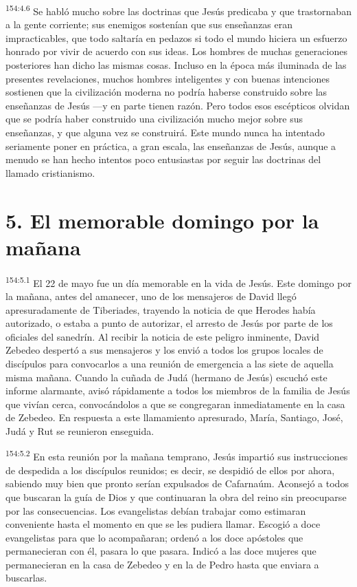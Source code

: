 \par
\textsuperscript{154:4.6} Se habló mucho sobre las doctrinas que Jesús predicaba y que trastornaban a la gente corriente; sus enemigos sostenían que sus enseñanzas eran impracticables, que todo saltaría en pedazos si todo el mundo hiciera un esfuerzo honrado por vivir de acuerdo con sus ideas. Los hombres de muchas generaciones posteriores han dicho las mismas cosas. Incluso en la época más iluminada de las presentes revelaciones, muchos hombres inteligentes y con buenas intenciones sostienen que la civilización moderna no podría haberse construido sobre las enseñanzas de Jesús ---y en parte tienen razón. Pero todos esos escépticos olvidan que se podría haber construido una civilización mucho mejor sobre sus enseñanzas, y que alguna vez se construirá. Este mundo nunca ha intentado seriamente poner en práctica, a gran escala, las enseñanzas de Jesús, aunque a menudo se han hecho intentos poco entusiastas por seguir las doctrinas del llamado cristianismo.

\section*{5. El memorable domingo por la mañana}
\par
\textsuperscript{154:5.1} El 22 de mayo fue un día memorable en la vida de Jesús. Este domingo por la mañana, antes del amanecer, uno de los mensajeros de David llegó apresuradamente de Tiberiades, trayendo la noticia de que Herodes había autorizado, o estaba a punto de autorizar, el arresto de Jesús por parte de los oficiales del sanedrín. Al recibir la noticia de este peligro inminente, David Zebedeo despertó a sus mensajeros y los envió a todos los grupos locales de discípulos para convocarlos a una reunión de emergencia a las siete de aquella misma mañana. Cuando la cuñada de Judá (hermano de Jesús) escuchó este informe alarmante, avisó rápidamente a todos los miembros de la familia de Jesús que vivían cerca, convocándolos a que se congregaran inmediatamente en la casa de Zebedeo. En respuesta a este llamamiento apresurado, María, Santiago, José, Judá y Rut se reunieron enseguida.

\par
\textsuperscript{154:5.2} En esta reunión por la mañana temprano, Jesús impartió sus instrucciones de despedida a los discípulos reunidos; es decir, se despidió de ellos por ahora, sabiendo muy bien que pronto serían expulsados de Cafarnaúm. Aconsejó a todos que buscaran la guía de Dios y que continuaran la obra del reino sin preocuparse por las consecuencias. Los evangelistas debían trabajar como estimaran conveniente hasta el momento en que se les pudiera llamar. Escogió a doce evangelistas para que lo acompañaran; ordenó a los doce apóstoles que permanecieran con él, pasara lo que pasara. Indicó a las doce mujeres que permanecieran en la casa de Zebedeo y en la de Pedro hasta que enviara a buscarlas.


